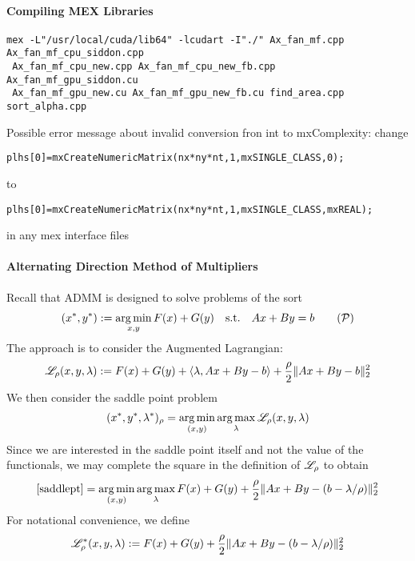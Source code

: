 \documentclass[12pt]{article}
\begin{document}
\paragraph{Compiling MEX Libraries}

\begin{verbatim}
mex -L"/usr/local/cuda/lib64" -lcudart -I"./" Ax_fan_mf.cpp Ax_fan_mf_cpu_siddon.cpp
 Ax_fan_mf_cpu_new.cpp Ax_fan_mf_cpu_new_fb.cpp Ax_fan_mf_gpu_siddon.cu 
 Ax_fan_mf_gpu_new.cu Ax_fan_mf_gpu_new_fb.cu find_area.cpp sort_alpha.cpp
\end{verbatim}

Possible error message about invalid conversion fron int to mxComplexity: change 

\begin{verbatim}
plhs[0]=mxCreateNumericMatrix(nx*ny*nt,1,mxSINGLE_CLASS,0);
\end{verbatim} 

to 

\begin{verbatim}
plhs[0]=mxCreateNumericMatrix(nx*ny*nt,1,mxSINGLE_CLASS,mxREAL);
\end{verbatim}

in any mex interface files

\paragraph{Alternating Direction Method of Multipliers}
Recall that ADMM is designed to solve problems of the sort 
\begin{align}
(x^*,y^*) : = \argmin_{x,y} F(x)+G(y)\quad \st\quad  Ax+By = b \tag{$\mathcal{P}$}
\end{align} The approach is to consider the Augmented Lagrangian: 
\begin{align*}
\mathscr{L}_\rho(x,y,\lambda) : = F(x)+G(y) + \left\langle \lambda, Ax+By-b\right \rangle +\frac{\rho}{2}\|Ax+By-b\|_2^2
\end{align*} We then consider the saddle point problem 
\begin{align}
(x^*,y^*,\lambda^*)_\rho = \operatorname*{arg\, min}_{(x,y)}\operatorname*{arg\, max}_\lambda \mathscr{L}_\rho(x,y,\lambda)\label{saddlept} 
\end{align}  Since we are interested in the saddle point itself and not the value of the functionals, we may complete the square in the definition of $\mathscr{L}_\rho$ to obtain 
\begin{align*}
\eqref{saddlept} = \operatorname*{arg\, min}_{(x,y)}\operatorname*{arg\, max}_\lambda F(x) + G(y) +\frac{\rho}{2}\|Ax+By-(b-\lambda/\rho)\|_2^2
\end{align*}For notational convenience, we define
\begin{align*}
\mathscr{L}_\rho^*(x,y,\lambda): =  F(x) + G(y) +\frac{\rho}{2}\|Ax+By-(b-\lambda/\rho)\|_2^2
\end{align*}
\end{document}
